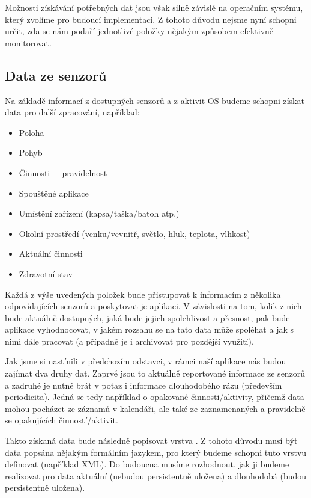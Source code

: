\documentclass[thesis=M,czech]{FITthesis}[2012/06/26]
\begin{document}
Možnosti získávání potřebných dat jsou však silně závislé na operačním systému, který zvolíme pro budoucí implementaci. Z tohoto důvodu nejsme nyní schopni určit, zda se nám podaří jednotlivé položky nějakým způsobem efektivně monitorovat.

\subsection{Data ze senzorů}
Na základě informací z dostupných senzorů a z aktivit OS budeme schopni získat data pro další zpracování, například:

\begin{itemize}
\item    Poloha
\item    Pohyb
\item    Činnosti + pravidelnost
\item    Spouštěné aplikace
\item    Umístění zařízení (kapsa/taška/batoh atp.)
\item    Okolní prostředí (venku/vevnitř, světlo, hluk, teplota, vlhkost)
\item    Aktuální činnosti
\item    Zdravotní stav
\end{itemize}

Každá z výše uvedených položek bude přistupovat k informacím z několika odpovídajících senzorů a poskytovat je aplikaci. V závislosti na tom, kolik z nich bude aktuálně dostupných, jaká bude jejich spolehlivost a přesnost, pak bude aplikace vyhodnocovat, v jakém rozsahu se na tato data může spoléhat a jak s nimi dále pracovat (a případně je i archivovat pro pozdější využití).

Jak jsme si nastínili v předchozím odstavci, v rámci naší aplikace nás budou zajímat dva druhy dat. Zaprvé jsou to aktuálně reportované informace ze senzorů a zadruhé je nutné brát v potaz i informace dlouhodobého rázu (především periodicita). Jedná se tedy například o opakované činnosti/aktivity, přičemž data mohou pocházet ze záznamů v kalendáři, ale také ze zaznamenaných a pravidelně se opakujících činností/aktivit.

Takto získaná data bude následně popisovat vrstva . Z tohoto důvodu musí být data popsána nějakým formálním jazykem, pro který budeme schopni tuto vrstvu definovat (například XML). Do budoucna musíme rozhodnout, jak ji budeme realizovat pro data aktuální (nebudou persistentně uložena) a dlouhodobá (budou persistentně uložena).
\end{document}
